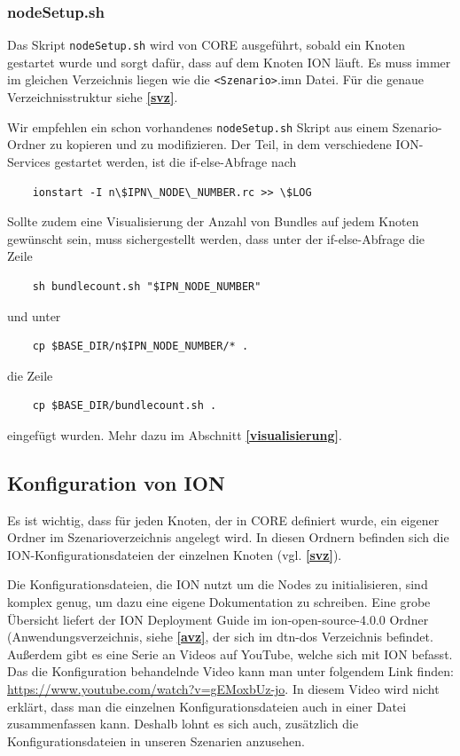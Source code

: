 \documentclass{article}
\begin{document}
\subsubsection{nodeSetup.sh}
Das Skript \texttt{nodeSetup.sh} wird von CORE ausgeführt, sobald ein Knoten gestartet wurde und sorgt dafür, dass auf dem Knoten ION läuft. Es muss immer im gleichen Verzeichnis liegen wie die \texttt{<Szenario>}.imn Datei. Für die genaue Verzeichnisstruktur siehe \textbf{\ref{svz}}.\par
Wir empfehlen ein schon vorhandenes \texttt{nodeSetup.sh} Skript aus einem Szenario-Ordner zu kopieren und zu modifizieren. Der Teil, in dem verschiedene ION-Services gestartet werden, ist die if-else-Abfrage nach
\begin{verbatim} 
    ionstart -I n\$IPN\_NODE\_NUMBER.rc >> \$LOG
\end{verbatim}
Sollte zudem eine Visualisierung der Anzahl von Bundles auf jedem Knoten gewünscht sein, muss sichergestellt werden, dass unter der if-else-Abfrage die Zeile \begin{verbatim}
    sh bundlecount.sh "$IPN_NODE_NUMBER"
\end{verbatim} und unter \begin{verbatim}
    cp $BASE_DIR/n$IPN_NODE_NUMBER/* .
\end{verbatim} die Zeile 
\begin{verbatim}
    cp $BASE_DIR/bundlecount.sh .
\end{verbatim} eingefügt wurden. Mehr dazu im Abschnitt \textbf{\ref{visualisierung}}.

\subsection{Konfiguration von ION}
Es ist wichtig, dass für jeden Knoten, der in CORE definiert wurde, ein eigener Ordner im Szenarioverzeichnis angelegt wird. In diesen Ordnern befinden sich die ION-Konfigurationsdateien der einzelnen Knoten (vgl. \textbf{\ref{svz}}).\par
Die Konfigurationsdateien, die ION nutzt um die Nodes zu initialisieren, sind komplex genug, um dazu eine eigene Dokumentation zu schreiben. Eine grobe Übersicht liefert der ION Deployment Guide im ion-open-source-4.0.0 Ordner (Anwendungsverzeichnis, siehe \textbf{\ref{avz}}, der sich im dtn-dos Verzeichnis befindet. Außerdem gibt es eine Serie an Videos auf YouTube, welche sich mit ION befasst. Das die Konfiguration behandelnde Video kann man unter folgendem Link finden: \url{https://www.youtube.com/watch?v=gEMoxbUz-jo}. In diesem Video wird nicht erklärt, dass man die einzelnen Konfigurationsdateien auch in einer Datei zusammenfassen kann. Deshalb lohnt es sich auch, zusätzlich die Konfigurationsdateien in unseren Szenarien anzusehen.  
\end{document}
